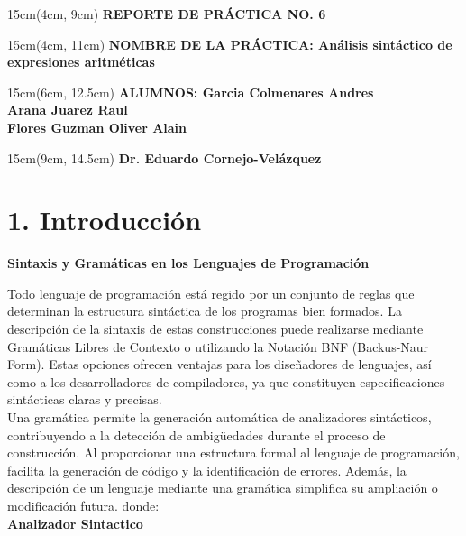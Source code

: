 \documentclass{article}
\begin{document}
\BgThispage
\-
\begin{textblock*}{15cm}(4cm, 9cm)
    {\fontsize{30pt}{16pt}\selectfont
    \textcolor{rojo}{\textbf{REPORTE DE PRÁCTICA NO. 6}}
    }
\end{textblock*}
\begin{textblock*}{15cm}(4cm, 11cm)
    {\fontsize{15pt}{16pt}\selectfont
    \textcolor{rojo}{\textbf{NOMBRE DE LA PRÁCTICA: Análisis sintáctico de expresiones aritméticas}}
    }
\end{textblock*}
\begin{textblock*}{15cm}(6cm, 12.5cm)
    {\fontsize{13pt}{16pt}\selectfont
    \textcolor{rojo}{\textbf{ALUMNOS: Garcia Colmenares Andres \\ Arana Juarez Raul \\ Flores Guzman Oliver Alain \\}}
    }
\end{textblock*}
\begin{textblock*}{15cm}(9cm, 14.5cm)
    {\fontsize{11pt}{16pt}\selectfont
    \textcolor{rojo}{\textbf{Dr. Eduardo Cornejo-Velázquez}}
    }
\end{textblock*}

\newpage

\section{1. Introducción}
\textbf{Sintaxis y Gramáticas en los Lenguajes de Programación}

Todo lenguaje de programación está regido por un conjunto de reglas que determinan la estructura sintáctica 
de los programas bien formados. La descripción de la sintaxis de estas construcciones puede realizarse 
mediante Gramáticas Libres de Contexto o utilizando la Notación BNF (Backus-Naur Form). Estas opciones 
ofrecen ventajas para los diseñadores de lenguajes, así como a los desarrolladores de compiladores, ya que 
constituyen especificaciones sintácticas claras y precisas. 
 \\
Una gramática permite la generación automática de analizadores sintácticos, contribuyendo a la detección de 
ambigüedades durante el proceso de construcción. Al proporcionar una estructura formal al lenguaje de 
programación, facilita la generación de código y la identificación de errores. Además, la descripción de un 
lenguaje mediante una gramática simplifica su ampliación o modificación futura.
donde: \\

\textbf{Analizador Sintactico}
\end{document}
